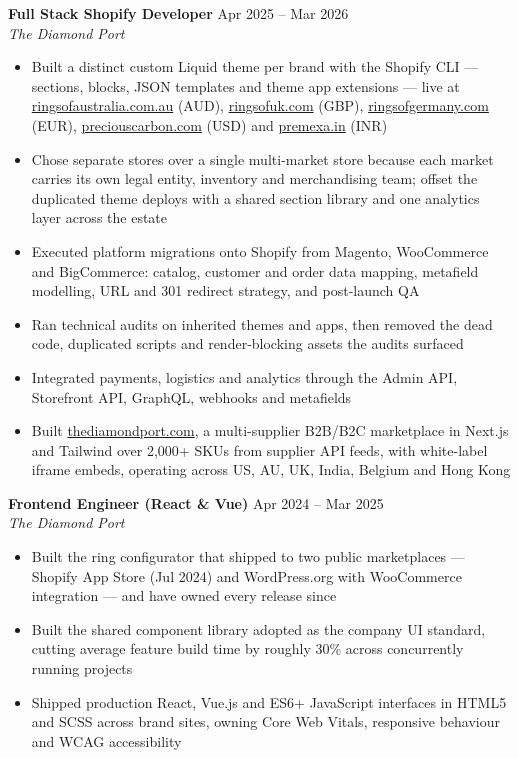 \documentclass[10pt]{article}
\begin{document}
\textbf{Full Stack Shopify Developer} \hfill Apr 2025 -- Mar 2026 \\
\textit{The Diamond Port}
\begin{itemize}
  \item Built a distinct custom Liquid theme per brand with the Shopify CLI --- sections, blocks, JSON templates and theme app extensions --- live at \href{https://ringsofaustralia.com.au}{ringsofaustralia.com.au} (AUD), \href{https://ringsofuk.com}{ringsofuk.com} (GBP), \href{https://ringsofgermany.com}{ringsofgermany.com} (EUR), \href{https://www.preciouscarbon.com}{preciouscarbon.com} (USD) and \href{https://premexa.in}{premexa.in} (INR)
  \item Chose separate stores over a single multi-market store because each market carries its own legal entity, inventory and merchandising team; offset the duplicated theme deploys with a shared section library and one analytics layer across the estate
  \item Executed platform migrations onto Shopify from Magento, WooCommerce and BigCommerce: catalog, customer and order data mapping, metafield modelling, URL and 301 redirect strategy, and post-launch QA
  \item Ran technical audits on inherited themes and apps, then removed the dead code, duplicated scripts and render-blocking assets the audits surfaced
  \item Integrated payments, logistics and analytics through the Admin API, Storefront API, GraphQL, webhooks and metafields
  \item Built \href{https://thediamondport.com}{thediamondport.com}, a multi-supplier B2B/B2C marketplace in Next.js and Tailwind over 2,000+ SKUs from supplier API feeds, with white-label iframe embeds, operating across US, AU, UK, India, Belgium and Hong Kong
\end{itemize}

\vspace{1pt}

\textbf{Frontend Engineer (React \& Vue)} \hfill Apr 2024 -- Mar 2025 \\
\textit{The Diamond Port}
\begin{itemize}
  \item Built the ring configurator that shipped to two public marketplaces --- Shopify App Store (Jul 2024) and WordPress.org with WooCommerce integration --- and have owned every release since
  \item Built the shared component library adopted as the company UI standard, cutting average feature build time by roughly 30\% across concurrently running projects
  \item Shipped production React, Vue.js and ES6+ JavaScript interfaces in HTML5 and SCSS across brand sites, owning Core Web Vitals, responsive behaviour and WCAG accessibility
\end{itemize}
\end{document}
